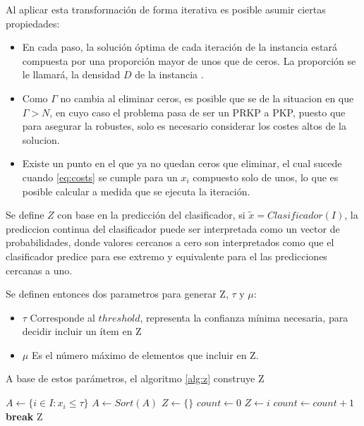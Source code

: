 \documentclass[spanish, a4paper, 12pt, openany,final]{book}
\begin{document}
 Al aplicar esta transformación de forma iterativa es posible asumir ciertas propiedades:
 
 
 \begin{itemize}
 	\item En cada paso, la solución óptima de cada iteración de la instancia estará compuesta por una proporción mayor de unos que de ceros. La proporción se le llamará, la densidad $D$ de la instancia .
 	
 	\item  Como $\Gamma$ no cambia al eliminar ceros, es posible que se de la situacion en que $\Gamma > N$, en cuyo caso el problema pasa de ser un PRKP a PKP, puesto que para asegurar la robustes, solo es necesario considerar los costes altos de la solucion.
 	
 	\item  Existe un punto en el que ya no quedan ceros que eliminar, el cual sucede cuando \ref{eq:costs} se cumple para un $x_i$ compuesto solo de unos, lo que es posible calcular a medida que se ejecuta la iteración.
 \end{itemize}
 
 
 Se define $Z$ con base en la predicción del clasificador, si $\tilde{x} = Clasificador(I)$, la prediccion continua del clasificador puede ser interpretada como un vector de probabilidades, donde valores cercanos a cero son interpretados como que el clasificador predice para ese extremo y equivalente para el las predicciones cercanas a uno.
 
 Se definen entonces dos parametros para generar Z, $\tau$ y $\mu$:
 
 \begin{itemize}
 	\item $\tau$ Corresponde al $threshold$, representa la confianza mínima necesaria, para decidir incluir un ítem en Z
 	\item $\mu$ Es el número máximo de elementos que incluir en Z.
 \end{itemize}
 
 A base de estos parámetros, el algoritmo \ref{alg:z} construye Z
 
 \begin{algorithm}[H]
 	\caption{$Z(\tilde{x},\tau,\mu)$}\label{alg:z}
 	\begin{algorithmic}
 		\State $A \gets \{ i \in I: x_i \leq \tau \}$
 		\State $A \gets Sort(A)$  
 		\State $Z \gets \{\}$	  
 		\State $count \gets 0$
 				  
 		\State $Z \gets i$
 		\State $count \gets count + 1$
 		\State \textbf{break}
 		\EndIf
 		\EndFor
 		\State Z
 	\end{algorithmic}
 \end{algorithm}
 
\end{document}
